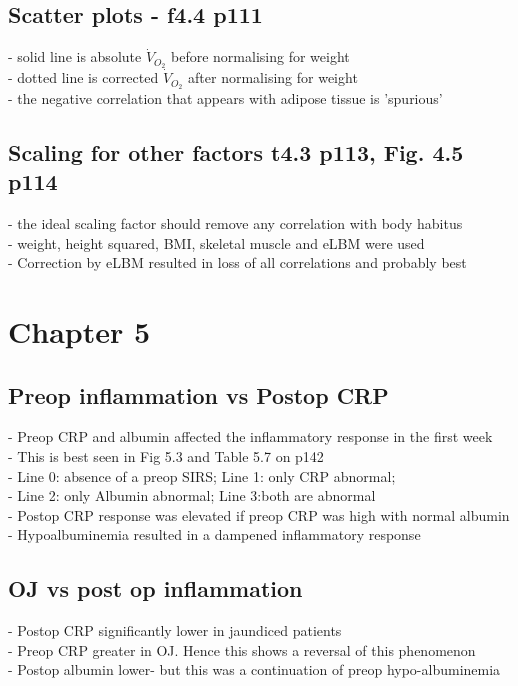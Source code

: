 \documentclass[12pt,a4paper]{article}
\begin{document}
\subsection{Scatter plots - f4.4 p111}

- solid line is absolute $\dot{V}_{O_2}$ before normalising for weight\\
- dotted line is corrected $\dot{V}_{O_2}$ after normalising for weight\\
- the negative correlation that appears with adipose tissue is 'spurious'

\subsection{Scaling for other factors t4.3 p113, Fig. 4.5 p114}

- the ideal scaling factor should remove any correlation with body habitus\\
- weight, height squared, BMI, skeletal muscle and eLBM were used\\
- Correction by eLBM resulted in loss of all correlations and probably best

\clearpage

\section{Chapter 5}
\subsection{Preop inflammation vs Postop CRP}
- Preop CRP and albumin affected the inflammatory response in the first week\\
- This is best seen in Fig 5.3 and Table 5.7 on p142\\
- Line 0: absence of a preop SIRS; Line 1: only CRP abnormal;\\
- Line 2: only Albumin abnormal; Line 3:both are abnormal\\
- Postop CRP response was elevated if preop CRP was high with normal albumin\\
- Hypoalbuminemia resulted in a dampened inflammatory response

\subsection{OJ vs post op inflammation}
- Postop CRP significantly lower in jaundiced patients\\
- Preop CRP greater in OJ. Hence this shows a reversal of this phenomenon\\
- Postop albumin lower- but this was a continuation of preop hypo-albuminemia
\end{document}
